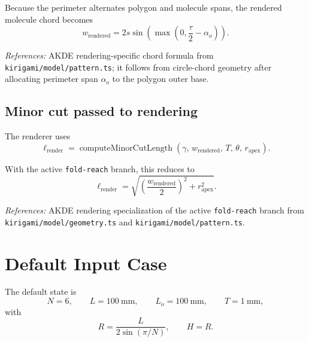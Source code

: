 \documentclass[11pt]{article}
\newcommand{\formularefs}[1]{%
\par\smallskip
\noindent\footnotesize\textit{References: }#1
\par\smallskip\normalsize
}
\begin{document}
Because the perimeter alternates polygon and molecule spans, the rendered molecule
chord becomes
\begin{equation}
w_{\mathrm{rendered}} = 2s\sin\!\left(\max\!\left(0,\frac{\tau}{2}-\alpha_o\right)\right).
\end{equation}

\formularefs{AKDE rendering-specific chord formula from \texttt{kirigami/model/pattern.ts}; it follows from circle-chord geometry after allocating perimeter span \(\alpha_o\) to the polygon outer base.}

\subsection{Minor cut passed to rendering}

The renderer uses
\begin{equation}
\ell_{\mathrm{render}} =
\operatorname{computeMinorCutLength}\!\left(\gamma,\,w_{\mathrm{rendered}},\,T,\,\theta,\,r_{\mathrm{apex}}\right).
\end{equation}

With the active \texttt{fold-reach} branch, this reduces to
\[
\ell_{\mathrm{render}} =
\sqrt{\left(\frac{w_{\mathrm{rendered}}}{2}\right)^2 + r_{\mathrm{apex}}^2}.
\]

\formularefs{AKDE rendering specialization of the active \texttt{fold-reach} branch from \texttt{kirigami/model/geometry.ts} and \texttt{kirigami/model/pattern.ts}.}

\section{Default Input Case}

The default state is
\[
N=6,
\qquad
L=100~\mathrm{mm},
\qquad
L_o=100~\mathrm{mm},
\qquad
T=1~\mathrm{mm},
\]
with
\[
R = \frac{L}{2\sin(\pi/N)},
\qquad
H = R.
\]
\end{document}
